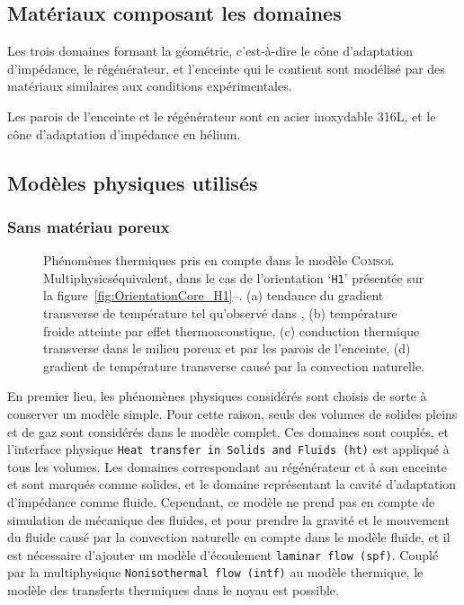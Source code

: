 \subsection{Matériaux composant les domaines}
Les trois domaines formant la géométrie, c'est-à-dire le cône d'adaptation d'impédance, le régénérateur, et l'enceinte qui le contient sont modélisé par des matériaux similaires aux conditions expérimentales. 

Les parois de l'enceinte et le régénérateur sont en acier inoxydable 316L, et le cône d'adaptation d'impédance en hélium.

\subsection{Modèles physiques utilisés}
\subsubsection{Sans matériau poreux}
\begin{figure}[!ht]
    \centering
    
    \caption{Phénomènes thermiques pris en compte dans le modèle \textsc{Comsol} Multi\-physics\textss\textregistered équivalent, dans le cas de l'orientation `\texttt{H1}' présentée sur la figure~\ref{fig:OrientationCore_H1}--. (a) tendance du gradient transverse de température tel qu'observé dans \cite{ramadan_design_2021}, (b) température froide atteinte par effet thermoacoustique, (c) conduction thermique transverse dans le milieu poreux et par les parois de l'enceinte, (d) gradient de température transverse causé par la convection naturelle.}
    \label{fig:SuperpositionComsol}
\end{figure}

En premier lieu, les phénomènes physiques considérés sont choisis de sorte à conserver un modèle simple. Pour cette raison, seuls des volumes  de solides pleins et de gaz sont considérés dans le modèle complet. Ces domaines sont couplés, et l'interface physique \texttt{Heat transfer in Solids and Fluids (ht)} est appliqué à tous les volumes. Les domaines correspondant au régénérateur et à son enceinte et sont marqués comme solides, et le domaine représentant la cavité d'adaptation d'impédance comme fluide. Cependant, ce modèle ne prend pas en compte de simulation de mécanique des fluides, et pour prendre la gravité et le mouvement du fluide causé par la convection naturelle en compte dans le modèle fluide, et il est nécessaire d'ajouter un modèle d'écoulement \texttt{laminar flow (spf)}. Couplé par la multiphysique \texttt{Nonisothermal flow (intf)} au modèle thermique, le modèle des transferts thermiques dans le noyau est possible.   

